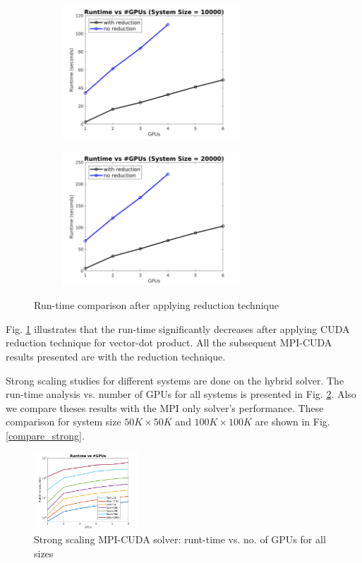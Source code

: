 \documentclass[sigplan,screen]{acmart}
\begin{document}
\begin{figure}
	\begin{subfigure}{0.3\textwidth}
		\includegraphics[trim= 10 5 35 10,clip, width=0.95\linewidth, height=5cm]{plots/CUDA_strong_10k.png} 
		\caption{}
	\end{subfigure}
	\begin{subfigure}{0.3\textwidth}
		\includegraphics[trim= 10 5 35 10,clip, width=0.95\linewidth, height=5cm]{plots/CUDA_strong_20k.png}
		\caption{}
	\end{subfigure}
	\caption{Run-time comparison after applying reduction technique}
	\label{compare}
\end{figure}
Fig. \ref{compare} illustrates that the run-time significantly decreases after applying CUDA reduction technique for vector-dot product. All the subsequent MPI-CUDA results presented are with the reduction technique. 

Strong scaling studies for different systems are done on the hybrid solver. The run-time analysis vs. number of GPUs for all systems is presented in Fig. \ref{cuda-strong}. Also we compare theses results with the MPI only solver's performance. These comparison for system size $50K\times50K$ and $100K\times 100K$ are shown in Fig. \ref{compare_strong}.

\begin{figure}[h!]
	\begin{center}
		\includegraphics[width=0.35\textwidth]{plots/CUDA_strong_allranks_log.png}
	\end{center}
	\caption{Strong scaling MPI-CUDA solver: runt-time vs. no. of GPUs for all sizes}
	\label{cuda-strong}      
\end{figure}
\end{document}
